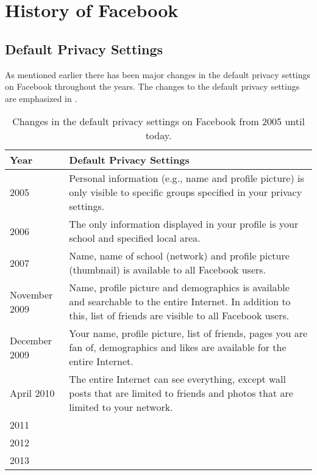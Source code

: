 \section{History of Facebook}
\subsection{Default Privacy Settings}
As mentioned earlier there has been major changes in the default privacy settings on Facebook throughout the years. The changes to the default privacy settings are emphasized in . 

\begin{center}
\begin{table}
\caption{\label{tab:dps}Changes in the default privacy settings on Facebook from 2005 until today.}
    \begin{tabular}{ | l | p{9cm} |}
    \hline
    \textbf{Year} & \textbf{Default Privacy Settings} \\ 
    \hline
    2005 & Personal information (e.g., name and profile picture) is 	only visible to specific groups specified in your privacy 			settings.\\ 
    \hline
    2006 & The only information displayed in your profile is your 		school and specified local area. \\ 
    \hline
    2007 & Name, name of school (network) and profile picture 			(thumbnail) is available to all Facebook users.\\
    \hline
    November 2009 & Name, profile picture and demographics is 			available and searchable to the entire Internet. In addition to 	this, list of friends are visible to all Facebook users.\\
	\hline
    December 2009 & Your name, profile picture, list of friends, 		pages you are fan of, demographics and likes are available for 		the entire Internet.\\
    \hline
    April 2010 & The entire Internet can see everything, except 		wall posts that are limited to friends and photos that are 			limited to your network. \\
    \hline
    2011 &  \\
    \hline
    2012 & \\
    \hline
    2013 & \\
    \hline
    \end{tabular}
   \end{table}
\end{center}



\markboth{}{}